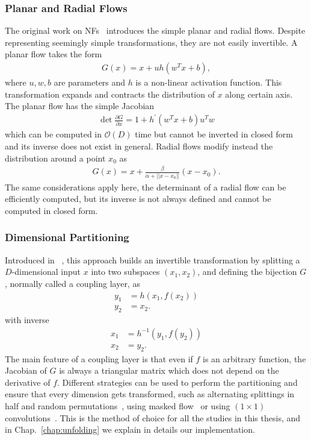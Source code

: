\subsubsection{Planar and Radial Flows}
The original work on NFs~\cite{pmlr-v37-rezende15} introduces the simple planar and radial flows. Despite representing seemingly simple transformations, they are not easily invertible.
A planar flow takes the form
%
\begin{align}
G(x) = x + u h(w^{T}x + b),
\end{align}
%
where $u, w, b$ are parameters and $h$ is a non-linear activation function. This transformation expands and contracts the distribution of $x$ along certain axis. The planar flow has the simple Jacobian
%
\begin{align}
\det \frac{\partial G}{\partial x} = 1 + h^{'}(w^{T}x + b) u^{T}w
\end{align}
%
which can be computed in $\mathcal{O}(D)$ time but cannot be inverted in closed form and its inverse does not exist in general.
Radial flows modify instead the distribution around a point $x_0$ as
%
\begin{align}
G(x) = x + \frac{\beta}{\alpha + ||x - x_0||}(x - x_0).
\end{align}
%
The same considerations apply here, the determinant of a radial flow can be efficiently computed, but its inverse is not always defined and cannot be computed in closed form.

\subsubsection{Dimensional Partitioning}

Introduced in ~\cite{coupling1, coupling2}, this approach builds an invertible transformation by splitting a $D$-dimensional input $x$ into two subspaces $(x_1, x_2)$, and defining the bijection $G$, normally called a coupling layer, as
%
\begin{align}
y_1 &= h(x_1, f(x_2))\\
y_2 &= x_2.
\end{align}
%
with inverse
%
\begin{align}
x_1 &= h^{-1}(y_1, f(y_2))\\
x_2 &= y_2.
\end{align}
%
The main feature of a coupling layer is that even if $f$ is an arbitrary function, the Jacobian of $G$ is always a triangular matrix which does not depend on the derivative of $f$. 
Different strategies can be used to perform the partitioning and ensure that every 
dimension gets transformed, such as alternating splittings in half and random 
permutations~\cite{coupling1}, using masked flow~\cite{coupling2} or using $(1 \times 1)$ convolutions~\cite{glow}. 
This is the method of choice for all the studies in this thesis, and in Chap.~\ref{chap:unfolding} we explain in details our implementation. 

